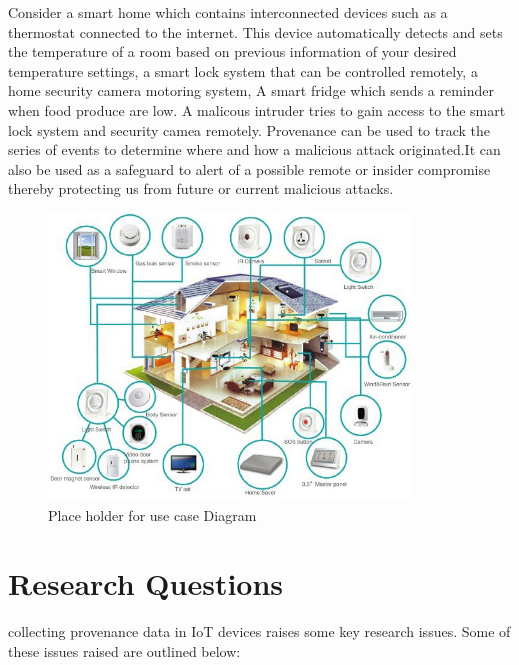 Consider a smart home which contains interconnected devices such as a thermostat connected to the internet. This device automatically detects and sets the temperature of a room based on previous information of your desired temperature settings, a smart lock system that can be controlled remotely, a home security camera motoring system, A smart fridge which sends a reminder when food produce are low. A malicous intruder tries to gain access to the smart lock system and security camea remotely. Provenance can be used to track the series  of events to determine where and how a malicious attack originated.It can also be used as a safeguard to alert of a possible remote or insider compromise thereby protecting us from future or current malicious attacks.

\begin{figure}[h]
\begin{center}

\includegraphics[height=3in]{smarthome-diagram.png}
\end{center}
\caption{Place holder for use case Diagram}

\end{figure}




\section{Research Questions}
collecting provenance data in IoT devices raises some key research issues. Some of these issues raised are outlined below:

